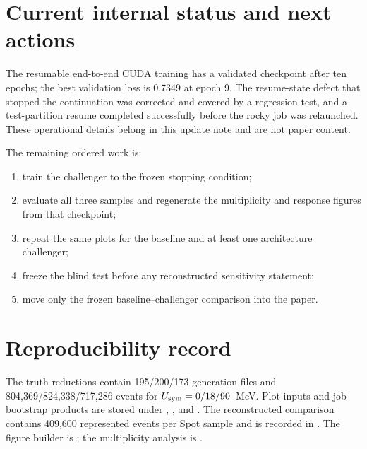 \documentclass[11pt,a4paper]{article}
\newcommand{\Usym}{U_{\rm sym}}
\begin{document}
\section{Current internal status and next actions}

The resumable end-to-end CUDA training has a validated checkpoint after ten
epochs; the best validation loss is 0.7349 at epoch 9.  The resume-state defect
that stopped the continuation was corrected and covered by a regression test,
and a test-partition resume completed successfully before the rocky job was
relaunched.  These operational details belong in this update note and are not
paper content.

The remaining ordered work is:
\begin{enumerate}[leftmargin=*]
\item train the challenger to the frozen stopping condition;
\item evaluate all three samples and regenerate the multiplicity and response
figures from that checkpoint;
\item repeat the same plots for the baseline and at least one architecture
challenger;
\item freeze the blind test before any reconstructed sensitivity statement;
\item move only the frozen baseline--challenger comparison into the paper.
\end{enumerate}

\section*{Reproducibility record}

The truth reductions contain 195/200/173 generation files and
804,369/824,338/717,286 events for $\Usym=0/18/90$~MeV.  Plot inputs and
job-bootstrap products are stored under
, , and
.  The reconstructed comparison contains 409,600
represented events per Spot sample and is recorded in
.  The figure builder is
; the multiplicity analysis is
.
\end{document}
